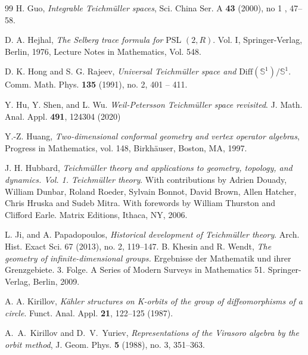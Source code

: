 \documentclass[12pt]{amsart}
\theoremstyle{plain}
\theoremstyle{definition}
\theoremstyle{remark}
\numberwithin{equation}{section} %
\numberwithin{figure}{section} %
\begin{document}
\begin{thebibliography}{99}
 H. Guo, {\it Integrable Teichm\"uller spaces},  Sci. China Ser. A {\bf 43} (2000), no 1 , 47--58.

D. A. Hejhal, {\it The Selberg trace formula for} PSL \((2, R)\). Vol. I, Springer-Verlag,
Berlin, 1976, Lecture Notes in Mathematics, Vol. 548.

  D. K. Hong and S. G. Rajeev, {\it
Universal Teichmüller space and} $\text{Diff}(\mathbb{S}^1)/\mathbb{S}^1$.
Comm. Math. Phys. {\bf 135} (1991), no. 2, 401 -- 411.




 Y. Hu, Y. Shen, and L. Wu. {\it Weil-Petersson Teichm\"uller space revisited}. J. Math. Anal. Appl. {\bf 491}, 124304
(2020)

Y.-Z. Huang, {\it Two-dimensional conformal geometry and vertex operator
  algebras}, Progress in Mathematics, vol. 148, Birkh\"auser, Boston, MA, 1997.


J. H. Hubbard, {\it Teichm\"uller theory and applications to geometry, topology, and dynamics. \emph{Vol. 1}. Teichm\"uller theory}. With contributions by Adrien Douady, William Dunbar, Roland Roeder, Sylvain Bonnot, David Brown, Allen Hatcher, Chris Hruska and Sudeb Mitra. With forewords by William Thurston and Clifford Earle. Matrix Editions, Ithaca, NY, 2006.

 L. Ji, and A. Papadopoulos, {\it
Historical development of Teichmüller theory}.
Arch. Hist. Exact Sci. 67 (2013), no. 2, 119–147. 
 B. Khesin and R. Wendt,
{\it The geometry of infinite-dimensional groups.}
Ergebnisse der Mathematik und ihrer Grenzgebiete. 3. Folge. A Series of Modern Surveys in Mathematics
51. Springer-Verlag, Berlin, 2009.

 A. A. Kirillov, {\it K\"ahler structures on K-orbits of the group of diffeomorphisms of a circle}. Funct.
Anal. Appl. {\bf 21}, 122--125 (1987).

A.~A.~Kirillov and D.~V.~Yuriev, {\it Representations of the Virasoro
algebra by the orbit method}, J. Geom. Phys. {\bf 5} (1988), no.
3, 351--363.



\end{thebibliography}
\end{document}
